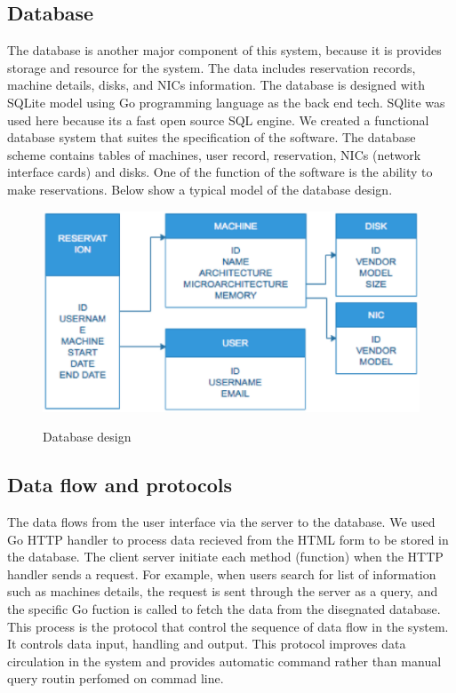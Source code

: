\subsection{Database}
The database is another major component of this system, because it is provides storage and resource for the system. The data includes reservation records, machine details, disks, and NICs information. The database is designed with SQLite model using Go programming language as the back end tech. SQlite was used here because its a fast open source SQL engine. We created a functional database system that suites the specification of the software. 
The database scheme contains tables of machines, user record, reservation, NICs (network interface cards) and disks.  One of the function of the software is the ability to make reservations.  Below show a typical model of the database design.
 \begin{figure}[h!]
\includegraphics[width = \linewidth]{Database.eps}
\label{fig:Database Schema} 
\caption{Database design}
\end{figure}
\subsection{Data flow and  protocols}
The data flows from the user interface via the server to the database. We used Go HTTP handler to process data recieved from the HTML form to be stored in the database. The client server initiate each method (function) when the HTTP handler sends a request. For example, when users search for list of information such as machines details, the request is sent through the server as a query, and the specific Go fuction is called to fetch the data from the disegnated database. This process is the protocol that control the sequence of data flow in the system. It controls data input, handling and output. This protocol improves data circulation in the system and provides automatic  command rather than manual query routin perfomed on commad line. 



